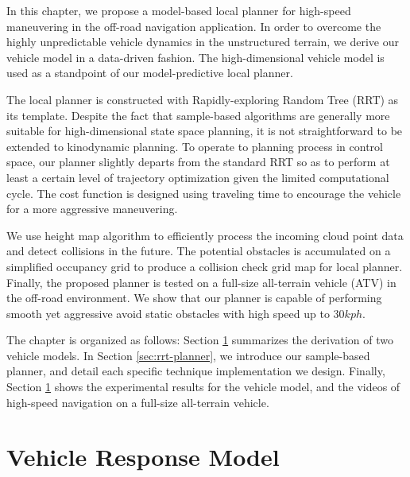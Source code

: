\documentclass[../thesis.tex]{subfiles}
\begin{document}
In this chapter, we propose a model-based local planner for high-speed maneuvering in the off-road navigation application. In order to overcome the highly unpredictable vehicle dynamics in the unstructured terrain, we derive our vehicle model in a data-driven fashion. The high-dimensional vehicle model is used as a standpoint of our model-predictive local planner.

The local planner is constructed with Rapidly-exploring Random Tree (RRT) \cite{kuffner2000rrt} as its template. 
Despite the fact that sample-based algorithms are generally more suitable for high-dimensional state space planning, it is not straightforward to be extended to kinodynamic planning. To operate to planning process in control space, our planner slightly departs from the standard RRT so as to perform at least a certain level of trajectory optimization given the limited computational cycle. The cost function is designed using traveling time to encourage the vehicle for a more aggressive maneuvering. 

We use height map algorithm to efficiently process the incoming cloud point data and detect collisions in the future. 
The potential obstacles is accumulated on a simplified occupancy grid to produce a collision check grid map for local planner. 
Finally, the proposed planner is tested on a full-size all-terrain vehicle (ATV) in the off-road environment. We show that 
our planner is capable of performing smooth yet aggressive avoid static obstacles with high speed up to $30 kph$.

The chapter is organized as follows:
Section \ref{sec:vehicle_model} summarizes the derivation of two vehicle models. In Section \ref{sec:rrt-planner}, we introduce our sample-based planner, and detail each specific technique implementation we design. Finally, Section \ref{sec:vehicle_model} shows the experimental results for the vehicle model, and the videos of high-speed navigation on a full-size all-terrain vehicle.

\section{Vehicle Response Model} \label{sec:vehicle_model}
\end{document}
